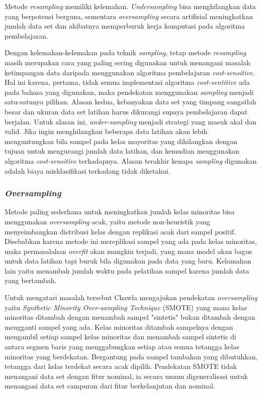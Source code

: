 \documentclass[12pt,a4paper,titlepage]{article}
\begin{document}
Metode \textit{resampling} memiliki kelemahan. \textit{Undersampling} bisa menghilangkan data yang berpotensi berguna, sementara \textit{oversampling} secara artifisial meningkatkan jumlah data set dan akibatnya memperburuk kerja komputasi pada algoritma pembelajaran.

Dengan kelemahan-kelemahan pada teknik \textit{sampling}, tetap metode \textit{resampling} masih merupakan cara yang paling sering digunakan untuk menangani masalah ketimpangan data daripada menggunakan algoritma pembelajaran \textit{cost-sensitive}. Hal ini karena, pertama, tidak semua implementasi algoritma \textit{cost-sentitive} ada pada bahasa yang digunakan, maka pendekatan menggunakan \textit{sampling} menjadi satu-satunya pilihan. Alasan kedua, kebanyakan data set yang timpang sangatlah besar dan ukuran data set latihan harus dikurangi supaya pembelajaran dapat berjalan. Untuk alasan ini, \textit{under-sampling} menjadi strategi yang masuk akal dan valid. Jika ingin menghilangkan beberapa data latihan akan lebih menguntungkan bila sampel pada kelas mayoritas yang dihilangkan dengan tujuan untuk mengurangi jumlah data latihan, dan kemudian menggunakan algoritma \textit{cost-sensitive} terhadapnya. Alasan terakhir kenapa \textit{sampling} digunakan adalah biaya misklasifikasi terkadang tidak diketahui.

\subsubsection{\textit{Oversampling}}\label{subsubsec:oversampling}

Metode paling sederhana untuk meningkatkan jumlah kelas minoritas bisa menggunakan \textit{oversampling} acak, yaitu metode non-heuristik yang menyeimbangkan distribusi kelas dengan replikasi acak dari sampel positif. Disebabkan karena metode ini mereplikasi sampel yang ada pada kelas minoritas, maka permasalahan \textit{overfit} akan mungkin terjadi, yang mana model akan bagus untuk data latihan tapi buruk bila digunakan pada data yang baru. Kelamahan lain yaitu menambah jumlah waktu pada pelatihan sampel karena jumlah data yang bertambah.

Untuk mengatasi masalah tersebut Chawla \cite{chawla2002smote} mengajukan pendekatan \textit{oversampling} yaitu \textit{Synthetic Minority Over-sampling Technique} (SMOTE) yang mana kelas minoritas ditambah dengan menambah sampel "sintetis" bukan ditambah dengan mengganti sampel yang ada. Kelas minoritas ditambah sampelnya dengan mengambil setiap sampel kelas minoritas dan menambah sampel sintetis di antara segmen baris yang menggabungkan setiap atau semua tetangga kelas minoritas yang berdekatan. Bergantung pada sampel tambahan yang dibutuhkan, tetangga dari kelas terdekat secara acak dipilih. Pendekatan SMOTE tidak menangani data set dengan fitur nominal, ia secara umum digeneralisasi untuk menangani data set campuran dari fitur berkelanjutan dan nominal.
\end{document}
